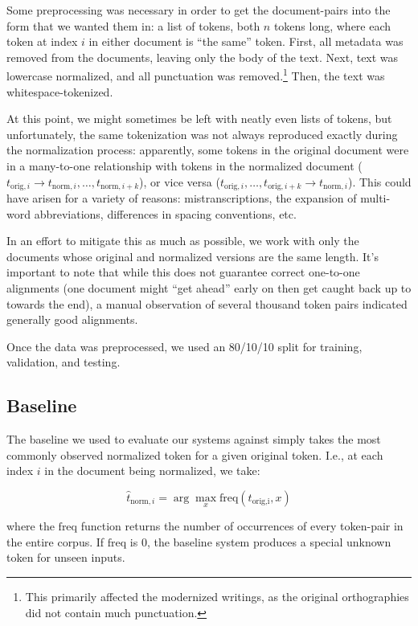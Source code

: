 \documentclass[11pt,a4paper]{article}
\begin{document}
Some preprocessing was necessary in order to get the document-pairs into the form that we wanted them in: a list of tokens, both $n$ tokens long, where each token at index $i$ in either document is ``the same'' token. First, all metadata was removed from the documents, leaving only the body of the text. Next, text was lowercase normalized, and all punctuation was removed.\footnote{This primarily affected the modernized writings, as the original orthographies did not contain much punctuation.} Then, the text was whitespace-tokenized.

At this point, we might sometimes be left with neatly even lists of tokens, but unfortunately, the same tokenization was not always reproduced exactly during the normalization process: apparently, some tokens in the original document were in a many-to-one relationship with tokens in the normalized document ($t_{\text{orig},i} \rightarrow t_{\text{norm},i}, \ldots, t_{\text{norm},i+k}$), or vice versa ($t_{\text{orig},i}, \ldots, t_{\text{orig},i+k} \rightarrow t_{\text{norm},i}$). This could have arisen for a variety of reasons: mistranscriptions, the expansion of multi-word abbreviations, differences in spacing conventions, etc. 

In an effort to mitigate this as much as possible, we work with only the documents whose original and normalized versions are the same length. It's important to note that while this does not guarantee correct one-to-one alignments (one document might ``get ahead'' early on then get caught back up to towards the end), a manual observation of several thousand token pairs indicated generally good alignments. 

Once the data was preprocessed, we used an 80/10/10 split for training, validation, and testing.

\subsection{Baseline}
The baseline we used to evaluate our systems against simply takes the most commonly observed normalized token for a given original token. I.e., at each index $i$ in the document being normalized, we take: 

\[ \hat{t}_{\text{norm},i} = \arg\max_{x} \text{freq}(t_\text{orig,i}, x) \]

\noindent where the $\text{freq}$ function returns the number of occurrences of every token-pair in the entire corpus. If $\text{freq}$ is 0, the baseline system produces a special unknown token for unseen inputs.
\end{document}
